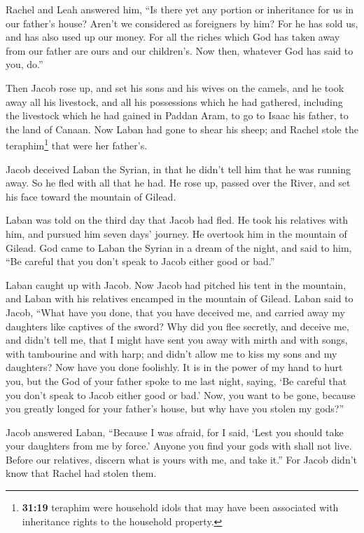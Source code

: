  Rachel and Leah answered him, ``Is there yet any portion
or inheritance for us in our father's house?  Aren't we
considered as foreigners by him? For he has sold us, and has also used
up our money.  For all the riches which God has taken
away from our father are ours and our children's. Now then, whatever God
has said to you, do.''

 Then Jacob rose up, and set his sons and his wives on
the camels,  and he took away all his livestock, and all
his possessions which he had gathered, including the livestock which he
had gained in Paddan Aram, to go to Isaac his father, to the land of
Canaan.  Now Laban had gone to shear his sheep; and
Rachel stole the teraphim\footnote{\textbf{31:19} teraphim were
  household idols that may have been associated with inheritance rights
  to the household property.} that were her father's.

 Jacob deceived Laban the Syrian, in that he didn't tell
him that he was running away.  So he fled with all that
he had. He rose up, passed over the River, and set his face toward the
mountain of Gilead.

 Laban was told on the third day that Jacob had fled.
 He took his relatives with him, and pursued him seven
days' journey. He overtook him in the mountain of Gilead.
 God came to Laban the Syrian in a dream of the night,
and said to him, ``Be careful that you don't speak to Jacob either good
or bad.''

 Laban caught up with Jacob. Now Jacob had pitched his
tent in the mountain, and Laban with his relatives encamped in the
mountain of Gilead.  Laban said to Jacob, ``What have you
done, that you have deceived me, and carried away my daughters like
captives of the sword?  Why did you flee secretly, and
deceive me, and didn't tell me, that I might have sent you away with
mirth and with songs, with tambourine and with harp;  and
didn't allow me to kiss my sons and my daughters? Now have you done
foolishly.  It is in the power of my hand to hurt you,
but the God of your father spoke to me last night, saying, `Be careful
that you don't speak to Jacob either good or bad.'  Now,
you want to be gone, because you greatly longed for your father's house,
but why have you stolen my gods?''

 Jacob answered Laban, ``Because I was afraid, for I
said, `Lest you should take your daughters from me by force.'
 Anyone you find your gods with shall not live. Before
our relatives, discern what is yours with me, and take it.'' For Jacob
didn't know that Rachel had stolen them.

